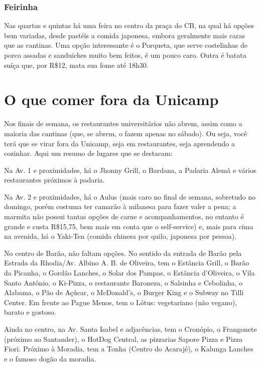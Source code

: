 \subsubsection{Feirinha}

Nas quartas e quintas há uma feira no centro da praça do CB, na qual há opções
bem variadas, desde pastéis a comida japonesa, embora geralmente mais caras que
as cantinas. Uma opção interessante é o Porqueta, que serve costelinhas de
porco assadas e sanduiches muito bem feitos, é um pouco caro. Outra é batata
suíça que, por R\$12, mata sua fome até 18h30.

\section{O que comer fora da Unicamp}

Nos finais de semana, os restaurantes universitários não abrem, assim como a
maioria das cantinas (que, se abrem, o fazem apenas no sábado). Ou seja, você
terá que se virar fora da Unicamp, seja em restaurantes, seja aprendendo a
cozinhar. Aqui um resumo de lugares que se destacam:

Na Av. 1 e proximidades, há o Jhonny Grill, o Bardana, a Padaria Alemã e vários
restaurantes próximos à padaria.

Na Av. 2 e proximidades, há o Aulus (mais caro no final de semana, sobretudo no
domingo, porém costuma ter camarão à milanesa para fazer valer a pena; a
marmita não possui tantas opções de carne e acompanhamentos, no entanto é
grande e custa R\$15,75, bem mais em conta que o self-service) e, mais para
cima na avenida, há o Yaki-Ten (comida chinesa por quilo, japonesa por pessoa).

No centro de Barão, não faltam opções. No sentido da entrada de Barão pela
Estrada da Rhodia/Av. Albino A. B. de Oliveira, tem o Estância Grill, o Barão
da Picanha, o Gordão Lanches, o Solar dos Pampas, o Estância d'Oliveira, o Vila
Santo Antônio, o Ki-Pizza, o restaurante Baroneza, o Salsinha e Cebolinha, o
Alabama, o Pão de Açúcar, o McDonald's, o Burger King e o Subway no Tilli
Center. Em frente ao Pague Menos, tem o Lótus: vegetariano (não vegano), barato
e gostoso.

Ainda no centro, na Av. Santa Isabel e adjacências, tem o Cronópio, o
Frangonete (próximo ao Santander), o HotDog Central, as pizzarias Sapore Pizza
e Pizza Fiori. Próximo à Moradia, tem a Tonha (Centro do Acarajé), o Kalunga
Lanches e o famoso dogão da moradia.

